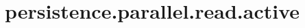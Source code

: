 \section{persistence.parallel.read.active}
\label{configuration:PersistenceParallelReadActive}
\TODO

